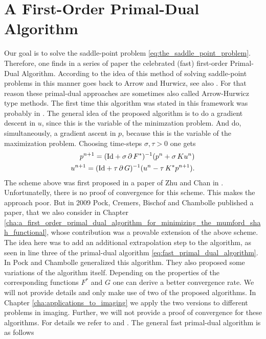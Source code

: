 \section{A First-Order Primal-Dual Algorithm} %
\label{sec:a_firs_order_primal_dual_algorithm}

    Our goal is to solve the saddle-point problem \ref{eq:the_saddle_point_problem}. Therefore, one finds in a series of paper the celebrated (fast) first-order Primal-Dual Algorithm. According to \cite{Chambolle-et-al-10} the idea of this method of solving saddle-point problems in this manner goes back to Arrow and Hurwicz, see also \cite{Arrow-Hurwicz}. For that reason these primal-dual approaches are sometimes also called Arrow-Hurwicz type methods. The first time this algorithm was stated in this framework was probably in \cite{Appleton-Talbot}. The general idea of the proposed algorithm is to do a gradient descent in $u$, since this is the variable of the minimzation problem. And do, simultaneously, a gradient ascent in $p$, because this is the variable of the maximization problem. Choosing time-steps $\sigma, \tau > 0$ one gets
        \begin{eqnarray}
            p^{n+1} = (\textnormal{Id} + \sigma\,\partial\,F^{\ast})^{-1}(p^{n} + \sigma\,Ku^{n}) \notag \\
            u^{n+1} = (\textnormal{Id} + \tau\,\partial\,G)^{-1}(u^{n} - \tau\,K^{\ast}p^{n+1}). \notag
        \end{eqnarray}
    The scheme above was first proposed in a paper of Zhu and Chan in \cite{Zhu-Chan}. Unfortunatelly, there is no proof of convergence for this scheme. This makes the approach poor. But in 2009 Pock, Cremers, Bischof and Chambolle published a paper, that we also consider in Chapter \ref{cha:a_first_order_primal_dual_algorithm_for_minimizing_the_mumford_shah_functional}, whose contribution was a provable extension of the above scheme. The idea here was to add an additional extrapolation step to the algorithm, as seen in line three of the primal-dual algorithm \ref{eq:fast_primal_dual_algorithm}. In \cite{Chambolle10afirst-order} Pock and Chambolle generalized this algorithm. They also proposed some variations of the algorithm itself. Depending on the properties of the corresponding functions $F^{\ast}$ and $G$ one can derive a better convergence rate. We will not provide details and only make use of two of the proposed algorithms. In Chapter \ref{cha:applications_to_imaging} we apply the two versions to different problems in imaging. Further, we will not provide a proof of convergence for these algorithms. For details we refer to \cite{Chambolle10afirst-order} and \cite{Pock-et-al-iccv09}. The general fast primal-dual algorithm is as follows


